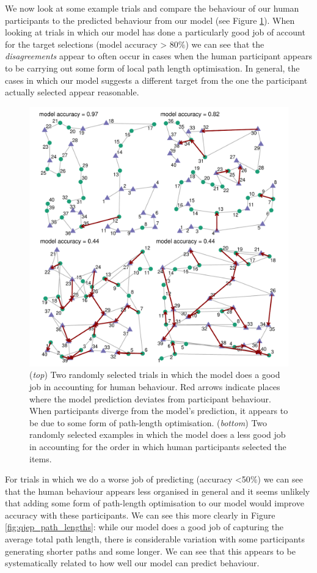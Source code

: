 \documentclass[preprints, article,submit,pdftex,moreauthors]{Definitions/mdpi}
\begin{document}
We now look at some example trials and compare the behaviour of our human participants to the predicted behaviour from our model (see Figure \ref{fig:qjep_paths}). When looking at trials in which our model has done a particularly good job of account for the target selections (model accuracy > 80$\%$) we can see that the \textit{disagreements} appear to often occur in cases when the human participant appears to be carrying out some form of local path length optimisation. In general, the cases in which our model suggests a different target from the one the participant actually selected appear reasonable. 


\begin{figure}[H]
\centering
\includegraphics[width=12 cm]{Figures/qjep_ex_paths.pdf}
\caption{(\textit{top}) Two randomly selected trials in which the model does a good job in accounting for human behaviour. Red arrows indicate places where the model prediction deviates from participant behaviour. When participants diverge from the model's prediction, it appears to be due to some form of path-length optimisation. (\textit{bottom}) Two randomly selected examples in which the model does a less good job in accounting for the order in which human participants selected the items.}
\label{fig:qjep_paths}
\end{figure} 

For trials in which we do a worse job of predicting (accuracy <50$\%$) we can see that the human behaviour appears less organised in general and it seems unlikely that adding some form of path-length optimisation to our model would improve accuracy with these participants. We can see this more clearly in Figure \ref{fig:qjep_path_lengths}: while our model does a good job of capturing the average total path length, there is considerable variation with some participants generating shorter paths and some longer. We can see  that this appears to be systematically related to how well our model can predict behaviour. 
\end{document}
